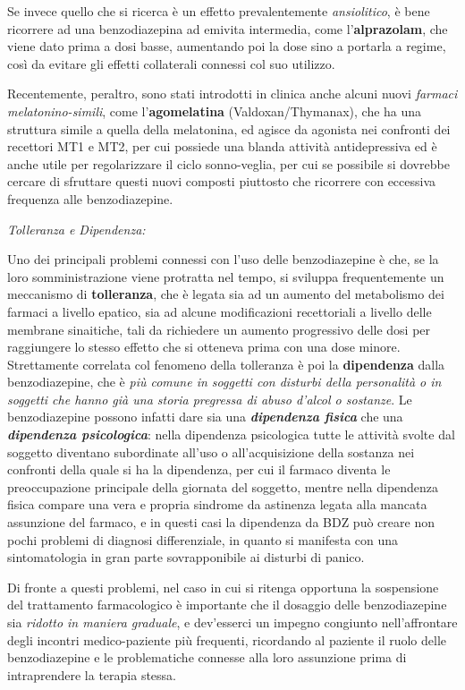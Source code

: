 \documentclass[]{article}
\begin{document}
Se invece quello che si ricerca è un effetto prevalentemente
\emph{ansiolitico}, è bene ricorrere ad una benzodiazepina ad emivita
intermedia, come l'\textbf{alprazolam}, che viene dato prima a dosi
basse, aumentando poi la dose sino a portarla a regime, così da evitare
gli effetti collaterali connessi col suo utilizzo.

Recentemente, peraltro, sono stati introdotti in clinica anche alcuni
nuovi \emph{farmaci melatonino-simili}, come l'\textbf{agomelatina}
(Valdoxan/Thymanax), che ha una struttura simile a quella della
melatonina, ed agisce da agonista nei confronti dei recettori MT1 e MT2,
per cui possiede una blanda attività antidepressiva ed è anche utile per
regolarizzare il ciclo sonno-veglia, per cui se possibile si dovrebbe
cercare di sfruttare questi nuovi composti piuttosto che ricorrere con
eccessiva frequenza alle benzodiazepine.

\emph{\emph{Tolleranza e Dipendenza:}}

Uno dei principali problemi connessi con l'uso delle benzodiazepine è
che, se la loro somministrazione viene protratta nel tempo, si sviluppa
frequentemente un meccanismo di \textbf{tolleranza}, che è legata sia ad
un aumento del metabolismo dei farmaci a livello epatico, sia ad alcune
modificazioni recettoriali a livello delle membrane sinaitiche, tali da
richiedere un aumento progressivo delle dosi per raggiungere lo stesso
effetto che si otteneva prima con una dose minore. Strettamente
correlata col fenomeno della tolleranza è poi la \textbf{dipendenza}
dalla benzodiazepine, che è \emph{più comune in soggetti con disturbi
della personalità o in soggetti che hanno già una storia pregressa di
abuso d'alcol o sostanze}. Le benzodiazepine possono infatti dare sia
una \textbf{\emph{dipendenza fisica}} che una \textbf{\emph{dipendenza
psicologica}}: nella dipendenza psicologica tutte le attività svolte dal
soggetto diventano subordinate all'uso o all'acquisizione della sostanza
nei confronti della quale si ha la dipendenza, per cui il farmaco
diventa le preoccupazione principale della giornata del soggetto, mentre
nella dipendenza fisica compare una vera e propria sindrome da astinenza
legata alla mancata assunzione del farmaco, e in questi casi la
dipendenza da BDZ può creare non pochi problemi di diagnosi
differenziale, in quanto si manifesta con una sintomatologia in gran
parte sovrapponibile ai disturbi di panico.

Di fronte a questi problemi, nel caso in cui si ritenga opportuna la
sospensione del trattamento farmacologico è importante che il dosaggio
delle benzodiazepine sia \emph{ridotto in maniera graduale}, e
dev'esserci un impegno congiunto nell'affrontare degli incontri
medico-paziente più frequenti, ricordando al paziente il ruolo delle
benzodiazepine e le problematiche connesse alla loro assunzione prima di
intraprendere la terapia stessa.
\end{document}
